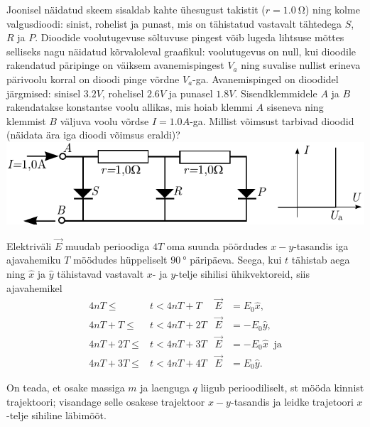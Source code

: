\documentclass[10pt]{article}
\begin{document}
\setAuthor{}

Joonisel näidatud skeem sisaldab kahte ühesugust takistit ($r=\SI {1.0}\ohm$) ning kolme valgusdioodi: sinist, rohelist ja punast, mis on tähistatud vastavalt tähtedega $S$, $R$ ja $P$. Dioodide voolutugevuse sõltuvuse pingest võib lugeda lihtsuse mõttes selliseks nagu näidatud kõrvaloleval graafikul: voolutugevus on null, kui dioodile rakendatud päripinge on väiksem avanemispingest $V_a$ ning suvalise nullist erineva pärivoolu korral on dioodi pinge võrdne $V_a$-ga. Avanemispinged on dioodidel järgmised: sinisel $\SI{3.2}V$, rohelisel  $\SI{2.6}V$ ja punasel  $\SI{1.8}V$. Sisendklemmidele $A$ ja $B$ rakendatakse konstantse voolu allikas, mis hoiab klemmi $A$ siseneva ning klemmist $B$ väljuva voolu võrdse $I=\SI{1.0}A$-ga. Millist võimsust tarbivad dioodid (näidata ära iga dioodi võimsus eraldi)? 
\includegraphics[scale=0.8]{2019-v2g-10-yl.pdf}
\probend
\bigskip

\setAuthor{}

Elektriväli $\vec E$ muudab perioodiga $4T$ oma suunda pöördudes $x-y$-tasandis iga 
ajavahemiku $T$ möödudes hüppeliselt $\SI{90}\degree$ päripäeva. Seega, kui $t$ tähistab aega 
ning $\hat x$ ja $\hat y$ tähistavad vastavalt $x$- ja $y$-telje sihilisi ühikvektoreid,  siis ajavahemikel
\begin{align*}
4nT\le &t < 4nT+T \;\; & \vec E&=E_0\hat x,\\
4nT+T\le &t < 4nT+2T   & \vec E&=-E_0\hat y,\\
4nT+2T\le &t < 4nT+3T  & \vec E&=-E_0\hat x \;\;\mbox{ja}\\
4nT+3T\le &t < 4nT+4T & \vec E&=E_0\hat y.
\end{align*}

On teada, et osake massiga $m$ ja laenguga $q$ liigub perioodiliselt, st mööda kinnist trajektoori; visandage selle osakese 
trajektoor $x-y$-tasandis ja leidke trajetoori $x$-telje sihiline läbimõõt.
\probend
\bigskip
\end{document}
